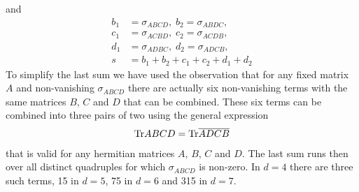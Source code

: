 \documentclass[10pt,a4paper]{article}
\newcommand{\Tr}{\mathrm{Tr}\vspace{-2pt}}
\begin{document}
and
\begin{align}
  b_1 &= \sigma_{ABCD},\; b_2 = \sigma_{ABDC}, \\
  c_1 &= \sigma_{ACBD},\; c_2 = \sigma_{ACDB}, \\
  d_1 &= \sigma_{ADBC},\; d_2 = \sigma_{ADCB}, \\
  s &= b_1 + b_2 + c_1 + c_2 + d_1 + d_2
\end{align}
To simplify the last sum we have used the observation that for
any fixed matrix $A$ and non-vanishing $\sigma_{ABCD}$ there are
actually six non-vanishing terms with the same matrices $B$, $C$
and $D$ that can be combined. These six terms can be combined into
three pairs of two using the general expression
\begin{align}
  \Tr ABCD = \Tr \overline{ADCB}
\end{align}
that is valid for any hermitian matrices $A$, $B$, $C$ and $D$.
The last sum runs then over all distinct quadruples for which
$\sigma_{ABCD}$ is non-zero.
In $d=4$ there are three such terms, 15 in $d=5$, 75 in $d=6$
and 315 in $d=7$.

\newpage
\end{document}
